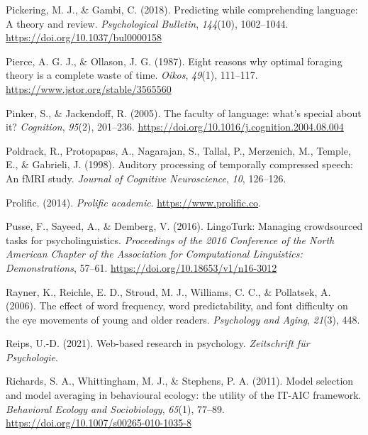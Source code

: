 \documentclass[a4paper, nobind]{templates/ociamthesis}
\newlength{\cslhangindent}
\newenvironment{CSLReferences}[2] %
 {%
  \setlength{\parindent}{0pt}
  \ifodd #1
  \let\oldpar\par
  \def\par{\hangindent=\cslhangindent\oldpar}
  \fi
  \setlength{\parskip}{1mm}
  \setlength{\baselineskip}{6mm}
 }%
 {}
\begin{document}
\begin{CSLReferences}{1}{0}
\leavevmode{}%
Pickering, M. J., \& Gambi, C. (2018). Predicting while comprehending language: A theory and review. \emph{Psychological Bulletin}, \emph{144}(10), 1002--1044. \url{https://doi.org/10.1037/bul0000158}

\leavevmode{}%
Pierce, A. G. J., \& Ollason, J. G. (1987). {Eight reasons why optimal foraging theory is a complete waste of time}. \emph{Oikos}, \emph{49}(1), 111--117. \url{https://www.jstor.org/stable/3565560}

\leavevmode{}%
Pinker, S., \& Jackendoff, R. (2005). The faculty of language: what's special about it? \emph{Cognition}, \emph{95}(2), 201--236. \url{https://doi.org/10.1016/j.cognition.2004.08.004}

\leavevmode{}%
Poldrack, R., Protopapas, A., Nagarajan, S., Tallal, P., Merzenich, M., Temple, E., \& Gabrieli, J. (1998). Auditory processing of temporally compressed speech: An fMRI study. \emph{Journal of Cognitive Neuroscience}, \emph{10}, 126--126.

\leavevmode{}%
Prolific. (2014). \emph{Prolific academic}. \url{https://www.prolific.co}.

\leavevmode{}%
Pusse, F., Sayeed, A., \& Demberg, V. (2016). {LingoTurk: Managing crowdsourced tasks for psycholinguistics}. \emph{Proceedings of the 2016 Conference of the North American Chapter of the Association for Computational Linguistics: Demonstrations}, 57--61. \url{https://doi.org/10.18653/v1/n16-3012}

\leavevmode{}%
Rayner, K., Reichle, E. D., Stroud, M. J., Williams, C. C., \& Pollatsek, A. (2006). The effect of word frequency, word predictability, and font difficulty on the eye movements of young and older readers. \emph{Psychology and Aging}, \emph{21}(3), 448.

\leavevmode{}%
Reips, U.-D. (2021). Web-based research in psychology. \emph{Zeitschrift f{ü}r Psychologie}.

\leavevmode{}%
Richards, S. A., Whittingham, M. J., \& Stephens, P. A. (2011). Model selection and model averaging in behavioural ecology: the utility of the IT-AIC framework. \emph{Behavioral Ecology and Sociobiology}, \emph{65}(1), 77--89. \url{https://doi.org/10.1007/s00265-010-1035-8}


\end{CSLReferences}
\end{document}
